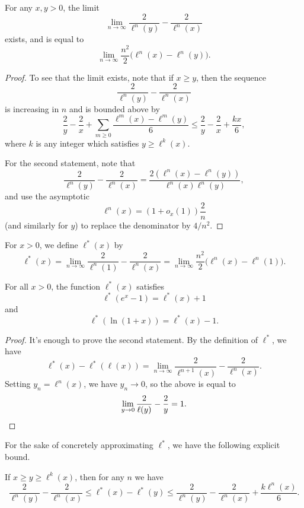 \documentclass[letterpaper,11pt]{article}
\begin{document}
\begin{cor} For any $x, y > 0$, the limit
\[
\lim_{n \rightarrow \infty} \frac{2}{\ell^n(y)} - \frac{2}{\ell^n(x)}
\]
exists, and is equal to
\[
\lim_{n \rightarrow \infty} \frac{n^2}{2}\Big(\ell^n(x) - \ell^n(y)\Big).
\]
\end{cor}
\begin{proof} To see that the limit exists, note that if $x \ge y$, then the sequence
\[
\frac{2}{\ell^n(y)} - \frac{2}{\ell^n(x)}
\]
is increasing in $n$ and is bounded above by
\[
\frac{2}{y} - \frac{2}{x} + \sum_{m \ge 0} \frac{\ell^m(x) - \ell^m(y)}{6} \le \frac{2}{y} - \frac{2}{x} + \frac{kx}{6},
\]
where $k$ is any integer which satisfies $y \ge \ell^k(x)$.

For the second statement, note that
\[
\frac{2}{\ell^n(y)} - \frac{2}{\ell^n(x)} = \frac{2(\ell^n(x) - \ell^n(y))}{\ell^n(x)\ell^n(y)},
\]
and use the asymptotic
\[
\ell^n(x) = (1+o_x(1))\frac{2}{n}
\]
(and similarly for $y$) to replace the denominator by $4/n^2$.
\end{proof}

\begin{defn} For $x > 0$, we define $\ell^*(x)$ by
\[
\ell^*(x) = \lim_{n \rightarrow \infty} \frac{2}{\ell^n(1)} - \frac{2}{\ell^n(x)} = \lim_{n \rightarrow \infty} \frac{n^2}{2}\Big(\ell^n(x) - \ell^n(1)\Big).
\]
\end{defn}

\begin{prop} For all $x > 0$, the function $\ell^*(x)$ satisfies
\[
\ell^*(e^x - 1) = \ell^*(x) + 1
\]
and
\[
\ell^*(\ln(1+x)) = \ell^*(x) - 1.
\]
\end{prop}
\begin{proof} It's enough to prove the second statement. By the definition of $\ell^*$, we have
\[
\ell^*(x) - \ell^*(\ell(x)) = \lim_{n \rightarrow \infty} \frac{2}{\ell^{n+1}(x)} - \frac{2}{\ell^n(x)}.
\]
Setting $y_n = \ell^n(x)$, we have $y_n \rightarrow 0$, so the above is equal to
\[
\lim_{y \rightarrow 0} \frac{2}{\ell(y)} - \frac{2}{y} = 1.\qedhere%
\]
\end{proof}

For the sake of concretely approximating $\ell^*$, we have the following explicit bound.

\begin{prop} If $x \ge y \ge \ell^k(x)$, then for any $n$ we have
\[
\frac{2}{\ell^n(y)} - \frac{2}{\ell^n(x)} \le \ell^*(x) - \ell^*(y) \le \frac{2}{\ell^n(y)} - \frac{2}{\ell^n(x)} + \frac{k\ell^n(x)}{6}.
\]
\end{prop}
\end{document}
